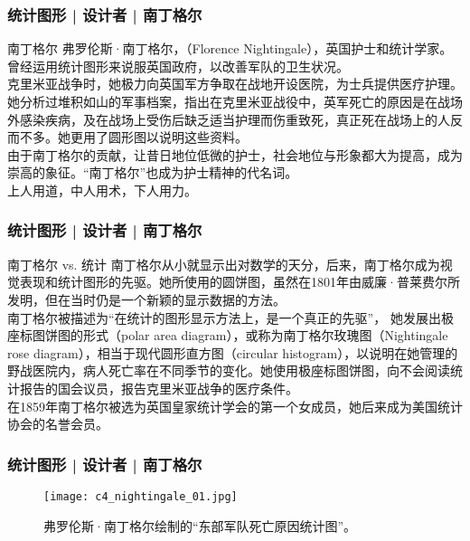 \begin{frame}
  \frametitle{统计图形 | 设计者 | 南丁格尔}
  \begin{block}{南丁格尔}
    弗罗伦斯·南丁格尔，（Florence Nightingale），英国护士和统计学家。曾经运用统计图形来说服英国政府，以改善军队的卫生状况。\\
    \vspace{0.5em}
克里米亚战争时，她极力向英国军方争取在战地开设医院，为士兵提供医疗护理。她分析过堆积如山的军事档案，指出在克里米亚战役中，英军死亡的原因是在战场外感染疾病，及在战场上受伤后缺乏适当护理而伤重致死，真正死在战场上的人反而不多。她更用了圆形图以说明这些资料。\\
    \vspace{0.5em}
由于南丁格尔的贡献，让昔日地位低微的护士，社会地位与形象都大为提高，成为崇高的象征。“南丁格尔”也成为护士精神的代名词。\\
    \vspace{0.5em}
    \alert{上人用道，中人用术，下人用力。}
  \end{block}
\end{frame}

\begin{frame}
  \frametitle{统计图形 | 设计者 | 南丁格尔}
  \begin{block}{南丁格尔 vs. 统计}
南丁格尔从小就显示出对数学的天分，后来，南丁格尔成为视觉表现和统计图形的先驱。她所使用的圆饼图，虽然在1801年由威廉·普莱费尔所发明，但在当时仍是一个新颖的显示数据的方法。\\
\vspace{0.5em}
南丁格尔被描述为“在统计的图形显示方法上，是一个真正的先驱”， 她发展出极座标图饼图的形式（polar area diagram），或称为南丁格尔玫瑰图（Nightingale rose diagram），相当于现代圆形直方图（circular histogram），以说明在她管理的野战医院内，病人死亡率在不同季节的变化。她使用极座标图饼图，向不会阅读统计报告的国会议员，报告克里米亚战争的医疗条件。\\
\vspace{0.5em}
在1859年南丁格尔被选为英国皇家统计学会的第一个女成员，她后来成为美国统计协会的名誉会员。
  \end{block}
\end{frame}

\begin{frame}
  \frametitle{统计图形 | 设计者 | 南丁格尔}
  \begin{figure}
    \centering
    \texttt{[image: c4\_nightingale\_01.jpg]}
    \caption{弗罗伦斯·南丁格尔绘制的“东部军队死亡原因统计图”。}
  \end{figure}
\end{frame}

